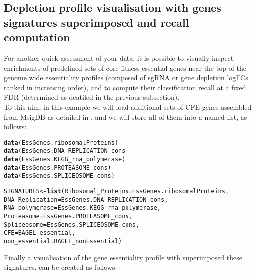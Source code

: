 \documentclass{article}\usepackage[]{graphicx}\usepackage[]{color}
\makeatletter
\newcommand{\hlstd}[1]{\textcolor[rgb]{0.345,0.345,0.345}{#1}}%
\newcommand{\hlkwb}[1]{\textcolor[rgb]{0.69,0.353,0.396}{#1}}%
\newcommand{\hlkwc}[1]{\textcolor[rgb]{0.333,0.667,0.333}{#1}}%
\newcommand{\hlkwd}[1]{\textcolor[rgb]{0.737,0.353,0.396}{\textbf{#1}}}%
\newenvironment{kframe}{%
 \def\at@end@of@kframe{}%
 \ifinner\ifhmode%
  \def\at@end@of@kframe{\end{minipage}}%
  \begin{minipage}{\columnwidth}%
 \fi\fi%
 \def\FrameCommand##1{\hskip\@totalleftmargin \hskip-\fboxsep
 \colorbox{shadecolor}{##1}\hskip-\fboxsep
     \hskip-\linewidth \hskip-\@totalleftmargin \hskip\columnwidth}%
 \MakeFramed {\advance\hsize-\width
   \@totalleftmargin\z@ \linewidth\hsize
   \@setminipage}}%
 {\par\unskip\endMakeFramed%
 \at@end@of@kframe}
\newenvironment{knitrout}{}{} %
\makeatother
\begin{document}
\subsection{Depletion profile visualisation with genes signatures superimposed and recall computation}
For another quick assessment of your data, it is possible to visually inspect enrichments of predefined sets of core-fitness essential genes near the top of the genome wide essentiality profiles (composed of sgRNA or gene depletion logFCs ranked in increasing order), and to compute their classification recall at a fixed FDR (determined as deatiled in the previous subsection).\\

To this aim, in this example we will load additional sets of CFE genes assembled from MsigDB \cite{Subramanian:2005wu} as detailed in \cite{Iorio:2017}, and we will store all of them into a named list, as follows:

\begin{knitrout}
\color{fgcolor}\begin{kframe}
\begin{alltt}
\hlkwd{data}\hlstd{(EssGenes.ribosomalProteins)}
\hlkwd{data}\hlstd{(EssGenes.DNA_REPLICATION_cons)}
\hlkwd{data}\hlstd{(EssGenes.KEGG_rna_polymerase)}
\hlkwd{data}\hlstd{(EssGenes.PROTEASOME_cons)}
\hlkwd{data}\hlstd{(EssGenes.SPLICEOSOME_cons)}

\hlstd{SIGNATURES}\hlkwb{<-}\hlkwd{list}\hlstd{(}\hlkwc{Ribosomal_Proteins}\hlstd{=EssGenes.ribosomalProteins,}
                 \hlkwc{DNA_Replication} \hlstd{= EssGenes.DNA_REPLICATION_cons,}
                 \hlkwc{RNA_polymerase} \hlstd{= EssGenes.KEGG_rna_polymerase,}
                 \hlkwc{Proteasome} \hlstd{= EssGenes.PROTEASOME_cons,}
                 \hlkwc{Spliceosome} \hlstd{= EssGenes.SPLICEOSOME_cons,}
                 \hlkwc{CFE} \hlstd{= BAGEL_essential,}
                 \hlkwc{non_essential} \hlstd{= BAGEL_nonEssential)}
\end{alltt}
\end{kframe}
\end{knitrout}
%
Finally a visualisation of the gene essentiality profile with superimposed these signatures, can be created as follows:
\end{document}
